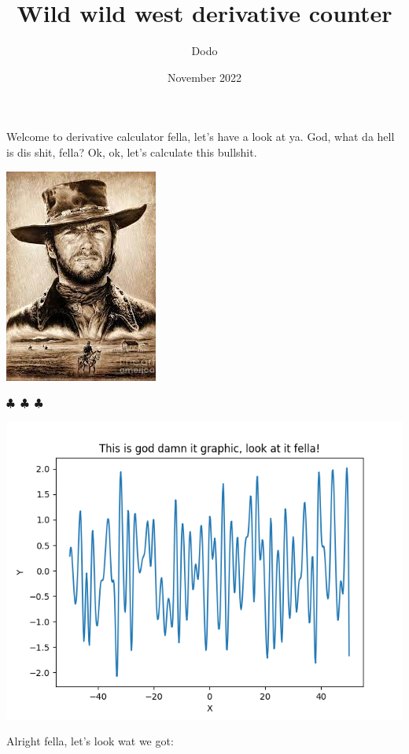 \documentclass{article}
\title{Wild wild west derivative counter}
\author{Dodo}
\date{November 2022}
\begin{document}
    \maketitle
    
        Welcome to derivative calculator fella, let's have a look at ya. God, what da hell is dis shit, fella?
        Ok, ok, let's calculate this bullshit.

        \begin{center}\begin{center} \includegraphics[scale=0.6]{funny_pics/cowboy.jpg} \end{center}\end{center}
        \begin{center}
        $\clubsuit$~$\clubsuit$~$\clubsuit$
        \end{center}

    \begin{center} \includegraphics[scale=0.6]{function_graph.png} \end{center}Alright fella, let's look wat we got:
\end{document}
